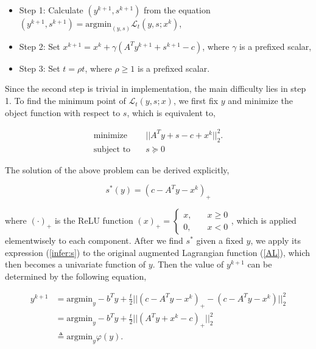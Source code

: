 \documentclass[a4paper]{article}
\begin{document}
\begin{itemize}
	\item Step 1: Calculate $(y^{k+1},s^{k+1})$ from the equation $(y^{k+1},s^{k+1})=\textrm{argmin}_{(y,s)}\mathcal{L}_t(y,s;x^k)$, 
	\item Step 2: Set $x^{k+1} = x^{k} + \gamma (A^Ty^{k+1}+s^{k+1}-c)$, where $\gamma$ is a prefixed scalar, 
	\item Step 3: Set $t = \rho t$, where $\rho \geq 1$ is a prefixed scalar.
\end{itemize}

Since the second step is trivial in implementation, the main difficulty lies in step 1. To find the minimum point of $\mathcal{L}_{t}(y,s; x)$, we first fix $y$ and minimize the object function with respect to $s$, which is equivalent to,  

\begin{equation}
\begin{split}
\textrm{minimize} \quad & ||A^Ty+s-c+x^k||^2_2.\\
\textrm{subject to} \quad & s\succeq0
\end{split}
\end{equation}

The solution of the above problem can be derived explicitly, 

\begin{equation}\label{infer:s}
s^*(y) = (c - A^Ty - x^k)_+
\end{equation}

where $(\cdot)_+$ is the ReLU function $(x)_+ = \left\{
\begin{aligned}
x, & \quad x \geq 0 \\
0, & \quad x < 0 
\end{aligned} \right.$, which is applied elementwisely to each component. After we find $s^*$ given a fixed $y$, we apply its expression (\ref{infer:s}) to the original augmented Lagrangian function (\ref{AL}), which then becomes a univariate function of $y$. Then the value of $y^{k+1}$ can be determined by the following equation, 

\begin{equation}
\begin{split}
y^{k+1} &=\textrm{argmin}_y -b^Ty + \frac{t}{2}||(c-A^Ty-x^k)_+ - (c-A^Ty-x^k)||^2_2 \\
&=\textrm{argmin}_y -b^Ty + \frac{t}{2}||(A^Ty+x^k-c)_+||^2_2 \\
&\triangleq \textrm{argmin}_y \varphi(y).
\end{split}
\end{equation}
\end{document}
